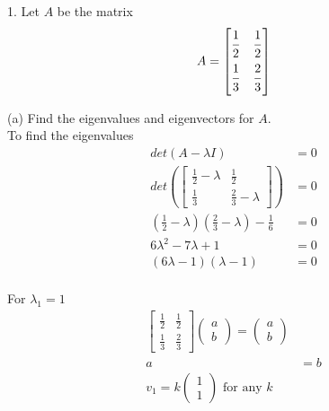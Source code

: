 \documentclass[a4paper, 10pt]{article}
\begin{document}
\pagestyle{fancy}

1. Let $A$ be the matrix
\[
  A = \begin{bmatrix} 
     \dfrac{\strut 1}{\strut 2} & \dfrac{\strut 1}{\strut 2} \\
     \dfrac{\strut 1}{\strut 3} & \dfrac{\strut 2}{\strut 3}
  \end{bmatrix}
\] 

(a) Find the eigenvalues and eigenvectors for $A$. \\

To find the eigenvalues
\begin{align*}
   det(A - \lambda I) &= 0 \\
   det \left( 
      \begin{bmatrix} 
         \frac{1}{2} - \lambda & \frac{1}{2}   \\
         \frac{1}{3} & \frac{2}{3} - \lambda
      \end{bmatrix}
   \right) &= 0 \\
   \left( \frac{1}{2} - \lambda \right) \left( \frac{2}{3} - \lambda \right) - \frac{1}{6} &= 0 \\ 
   6 \lambda^2 - 7\lambda + 1 &= 0 \\
   (6 \lambda - 1)(\lambda - 1) &= 0 \\
\end{align*}

For $\lambda_1 = 1$ 
\begin{align*}
   \begin{bmatrix} 
      \frac{1}{2} & \frac{1}{2} \\
      \frac{1}{3} & \frac{2}{3} 
   \end{bmatrix} \begin{pmatrix} a \\b  \end{pmatrix}  = \begin{pmatrix} a \\b \end{pmatrix}  \\ 
      a &= b \\
      v_1 = k \begin{pmatrix} 1 \\ 1 \end{pmatrix}  \text{ for any }k
\end{align*}
\end{document}
